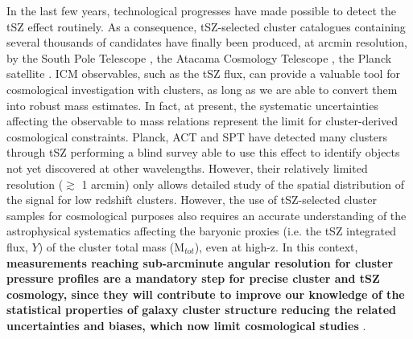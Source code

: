 \documentclass[11pt,a4paper,twoside,graphicx,color]{article}
\begin{document}
In the last few years, technological progresses have made possible to detect the tSZ effect routinely. As a consequence, tSZ-selected cluster catalogues containing several thousands of candidates have finally been produced, at arcmin resolution, by the South Pole Telescope \citep[SPT, FWHM $\sim$ 1.1 arcmin at 150 GHz,][]{Reichardt2013, Bleem2014}, the Atacama Cosmology Telescope \citep[ACT, FWHM $\sim$ 1.4 arcmin at 148 GHz, ][]{Hasselfield2013}, the Planck satellite \citep[FWHM $\sim$ 10 arcmin for tSZ,][]{PSZ1, PSZ2}.  
ICM observables, such as the tSZ flux, can provide a valuable tool for cosmological investigation with clusters, as long as we are able to convert them into robust mass estimates. In fact, at present, the systematic uncertainties affecting the observable to mass relations represent the limit for cluster-derived cosmological constraints. Planck, ACT and SPT have detected many clusters through tSZ performing a blind survey able to use this effect to identify objects not yet discovered at other wavelengths. However, their relatively limited resolution ($\gtrsim$ 1 arcmin) only allows detailed study of the spatial distribution of the signal for low redshift clusters. However, the use of tSZ-selected cluster samples for cosmological purposes also requires an accurate understanding of the astrophysical systematics affecting the baryonic proxies (i.e. the tSZ integrated flux, $Y$) of the cluster total mass (M$_{tot}$), even at high-z. In this context, {\bf measurements reaching sub-arcminute angular resolution for cluster pressure profiles are a mandatory step for precise cluster and tSZ cosmology, since they will contribute to improve our knowledge of the statistical properties of galaxy cluster structure reducing the related uncertainties and biases, which now limit cosmological studies} \citep[e.g.][]{number_counts2015, ymap}. 
\end{document}
